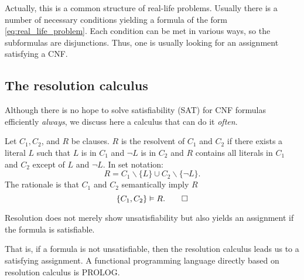 Actually, this is a common structure of real-life problems. 
Usually there is a number of necessary conditions yielding a formula of the form \eqref{eq:real_life_problem}.
Each condition can be met in various ways, so the subformulas are disjunctions. 
Thus, one is usually looking for an assignment satisfying a CNF.




\subsection{The resolution calculus}
Although there is no hope to solve satisfiability (SAT) for CNF formulas efficiently \emph{always}, we discuss here a calculus that can do it \emph{often}.
\begin{definition}
Let $C_1, C_2$, and $R$ be clauses. 
$R$ is the resolvent of $C_1$ and $C_2$ if there exists a literal $L$ such that $L$ is in $C_1$ and $\neg L$ is in $C_2$ and $R$ contains all literals in $C_1$ and $C_2$ except of $L$ and $\neg L$.
In set notation:
\[
R=C_1 \backslash\{L\} \cup C_2 \backslash\{\neg L\} .
\]
The rationale is that $C_1$ and $C_2$ semantically imply $R$
\[
\left\{C_1, C_2\right\} \vDash R . \qedhere
\]
\end{definition}

Resolution does not merely show unsatisfiability but also yields an assignment if the formula is satisfiable.

That is, if a formula is not unsatisfiable, then the resolution calculus leads us to a satisfying assignment.
A functional programming language directly based on resolution calculus is PROLOG.





